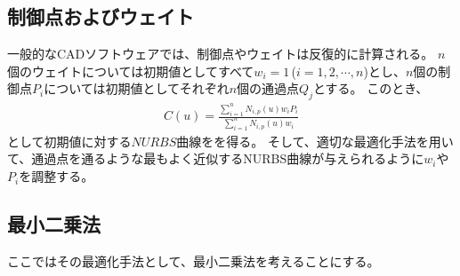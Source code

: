\subsection{制御点およびウェイト}
一般的なCADソフトウェアでは、制御点やウェイトは反復的に計算される。
$n$個のウェイトについては初期値としてすべて$w_i = 1$\,($i = 1, 2, \cdots, n$)とし、$n$個の制御点$P_i$については初期値としてそれぞれ$n$個の通過点$Q_j$とする。
このとき、
\begin{align*}
  C(u) = \frac{\displaystyle\sum_{i=1}^nN_{i, p}(u)w_iP_i}{\displaystyle\sum_{i=1}^nN_{i, p}(u)w_i}
\end{align*}
として初期値に対する$NURBS$曲線をを得る。
そして、適切な最適化手法を用いて、通過点を通るような最もよく近似するNURBS曲線が与えられるように$w_i$や$P_i$を調整する。


\clearpage
\subsection{最小二乗法\TBW}
ここではその最適化手法として、最小二乗法を考えることにする。



